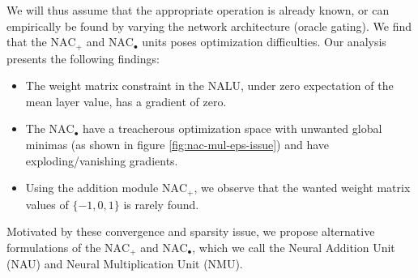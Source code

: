 We will thus assume that the appropriate operation is already known, or can empirically be found by varying the network architecture (oracle gating). We find that the $\text{NAC}_{+}$ and $\text{NAC}_{\bullet}$ units poses optimization difficulties. Our analysis presents the following findings:

\begin{itemize}
\item The weight matrix constraint in the NALU, under zero expectation of the mean layer value\cite{glorot-initialization}, has a gradient of zero.

\item The $\text{NAC}_{\bullet}$ have a treacherous optimization space with unwanted global minimas (as shown in figure \ref{fig:nac-mul-eps-issue}) and have exploding/vanishing gradients.

\item Using the addition module $\text{NAC}_{+}$, we observe that the wanted weight matrix values of $\{-1, 0, 1\}$ is rarely found.
\end{itemize}

Motivated by these convergence and sparsity issue, we propose alternative formulations of the $\text{NAC}_{+}$ and $\text{NAC}_{\bullet}$, which we call the Neural Addition Unit (NAU) and Neural Multiplication Unit (NMU).









